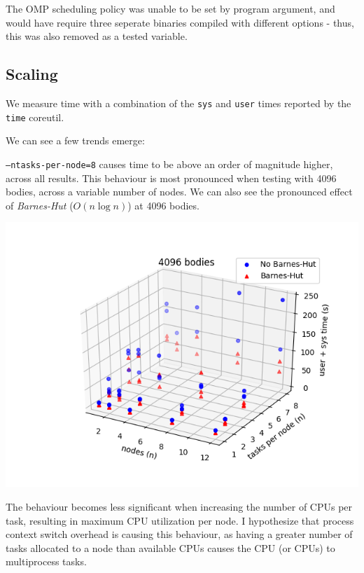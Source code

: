 \documentclass[11pt,a4paper]{article}
\begin{document}
The OMP scheduling policy was unable to be set by program argument, and would have require three seperate binaries compiled with different options - thus, this was also removed as a tested variable.


\subsection*{Scaling}

We measure time with a combination of the \texttt{sys} and \texttt{user} times reported by the \texttt{time} coreutil. 

We can see a few trends emerge:

\texttt{--ntasks-per-node=8} causes time to be above an order of magnitude higher, across all results. This behaviour is most pronounced when testing with 4096 bodies, across a variable number of nodes. We can also see the pronounced effect of \textit{Barnes-Hut} ($O(n \log n)$) at 4096 bodies.


\includegraphics[width=14.2cm]{4096-nodes-tasksPerNode}

The behaviour becomes less significant when increasing the number of CPUs per task, resulting in maximum CPU utilization per node. I hypothesize that process context switch overhead is causing this behaviour, as having a greater number of tasks allocated to a node than available CPUs causes the CPU (or CPUs) to multiprocess tasks. 
\end{document}
